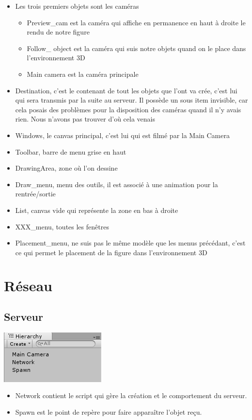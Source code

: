 \documentclass[a4paper,11pt]{article}
\begin{document}
		\begin{itemize}
			\item Les trois premiers objets sont les caméras
				\begin{itemize}
					\item Preview\_cam est la caméra qui affiche en permanence en haut à droite le rendu de notre figure
					\item Follow\_ object est la caméra qui suis notre objets quand on le place dans l'environnement 3D
					\item Main camera est la caméra principale
				\end{itemize}
			\item Destination, c'est le contenant de tout les objets que l'ont va crée, c'est lui qui sera transmis par la suite au serveur. Il possède un sous item invisible, car cela posais des problèmes pour la disposition des caméras quand il n'y avais rien. Nous n'avons pas trouver d'où cela venais
			\item Windows, le canvas principal, c'est lui qui est filmé par la Main Camera
			\item Toolbar, barre de menu grise en haut
			\item DrawingArea, zone où l'on dessine
			\item Draw\_menu, menu des outils, il est associé à une animation pour la rentrée/sortie
			\item List, canvas vide qui représente la zone en bas à droite
			\item XXX\_menu, toutes les fenêtres
			\item Placement\_menu, ne suis pas le même modèle que les menus précédant, c'est ce qui permet le placement de la figure dans l'environnement 3D
		\end{itemize}
		
\section{Réseau}
	\subsection{Serveur}
		\includegraphics[scale=0.9]{./images/arbserver.png}
		\begin{itemize}
			\item Network contient le script qui gère la création et le comportement du serveur.
			\item Spawn est le point de repère pour faire apparaître l'objet reçu.
		\end{itemize}
		
\end{document}
